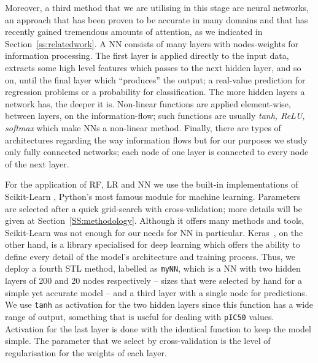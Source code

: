 \documentclass[10pt]{article}
\begin{document}
Moreover, a third method that we are utilising in this stage are neural networks, an approach that has been proven to be accurate in many domains and that has recently gained tremendous amounts of attention, as we indicated in Section~\ref{ss:relatedwork}. A NN consists of many layers with nodes-weights for information processing. The first layer is applied directly to the input data, extracts some high level features which passes to the next hidden layer, and so on, until the final layer which ``produces'' the output; a real-value prediction for regression problems or a probability for classification. The more hidden layers a network has, the deeper it is. Non-linear functions are applied element-wise, between layers, on the information-flow; such functions are usually \textit{tanh, ReLU, softmax} which make NNs a non-linear method. Finally, there are types of architectures regarding the way information flows but for our purposes we study only fully connected networks; each node of one layer is connected to every node of the next layer.

For the application of RF, LR and NN we use the built-in implementations of Scikit-Learn \cite{scikit-learn},  Python's most famous module for machine learning. Parameters are selected after a quick grid-search with cross-validation; more details will be given at Section~\ref{SS:methodology}. Although it offers many methods and tools, Scikit-Learn was not enough for our needs  for NN in particular. Keras~\cite{chollet2015keras}, on the other hand, is a library specialised for deep learning which offers the ability to define every detail of the model's architecture and training process. Thus, we deploy a fourth  STL method, labelled as \texttt{myNN}, which is a NN with two hidden layers of 200 and 20 nodes respectively -- sizes that were selected by hand for a simple yet accurate model -- and a third layer with a single node for predictions. We use \texttt{tanh} as activation for the two hidden layers since this function has a wide range of output, something that is useful for dealing with \texttt{pIC50} values. Activation for the last layer is done with the identical function to keep the model simple. The parameter that we select by cross-validation is the level of regularisation for the weights of each layer.

\end{document}
